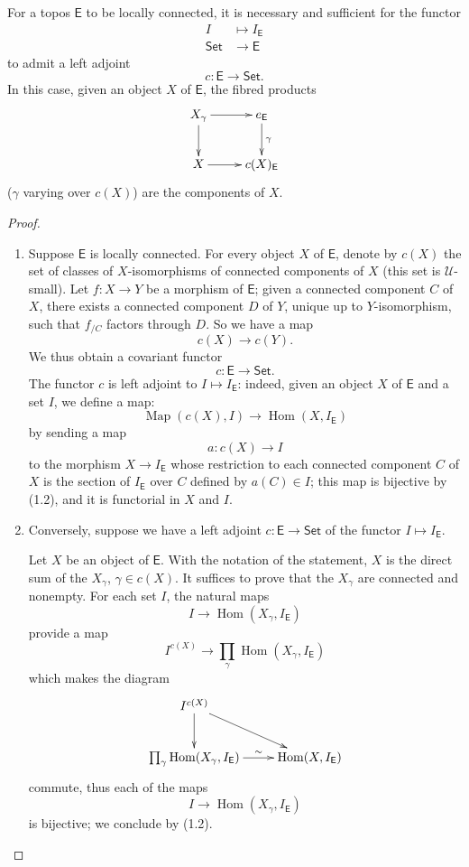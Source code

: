 \documentclass[10pt,oneside]{amsart}
\newcommand{\oldpage}[1]{\marginnote{\textbf{#1}}}
\newcommand{\cal}{\mathcal}
\newcommand{\cat}{\mathsf}
\newcommand{\Set}{\cat{Set}}
\DeclareMathOperator{\Hom}{Hom}
\DeclareMathOperator{\Map}{Map}
\begin{document}
\subsection{}
For a topos $\cat{E}$ to be locally connected, it is necessary and sufficient for the functor
\begin{align*}
  I & \longmapsto I_\cat{E}\\
  \Set & \longrightarrow\cat{E}
\end{align*}
to admit a left adjoint
\[
  c:\cat{E}\longrightarrow\Set.
\]
In this case, given an object $X$ of $\cat{E}$, the fibred products
\[
  \xymatrix{
    X_\gamma\ar[r]\ar[d] & e_\cat{E}\ar[d]^\gamma\\
    X\ar[r] & c(X)_\cat{E}
  }
\]
($\gamma$ varying over $c(X)$) are the components of $X$.

\begin{proof}
\medskip\noindent
\begin{enumerate}[label=(\roman*)]
  \item Suppose $\cat{E}$ is locally connected.
    For every object $X$ of $\cat{E}$, denote by $c(X)$ the set of classes of $X$-isomorphisms of connected components of $X$ (this set is $\cal{U}$-small).
    Let $f:X\to Y$ be a morphism of $\cat{E}$;
    given a connected component $C$ of $X$, there exists a connected component $D$ of $Y$, unique up to $Y$-isomorphism, such that $f_{/C}$ factors through $D$.
    So we have a map
    \[
      c(X)\longrightarrow c(Y).
    \]
    \oldpage{4}
    We thus obtain a covariant functor
    \[
      c:\cat{E}\longrightarrow\Set.
    \]
    The functor $c$ is left adjoint to $I\mapsto I_\cat{E}$: indeed, given an object $X$ of $\cat{E}$ and a set $I$, we define a map:
    \[
      \Map(c(X),I)\longrightarrow\Hom(X,I_\cat{E})
    \]
    by sending a map
    \[
      a:c(X)\longrightarrow I
    \]
    to the morphism $X\to I_\cat{E}$ whose restriction to each connected component $C$ of $X$ is the section of $I_\cat{E}$ over $C$ defined by $a(C)\in I$;
    this map is bijective by (1.2), and it is functorial in $X$ and $I$.
  \item Conversely, suppose we have a left adjoint $c:\cat{E}\to\Set$ of the functor $I\mapsto I_\cat{E}$.

    Let $X$ be an object of $\cat{E}$.
    With the notation of the statement, $X$ is the direct sum of the $X_\gamma$, $\gamma\in c(X)$.
    It suffices to prove that the $X_\gamma$ are connected and nonempty.
    For each set $I$, the natural maps
    \[
      I\longrightarrow\Hom(X_\gamma,I_\cat{E})
    \]
    provide a map
    \[
      I^{c(X)}\longrightarrow\prod_\gamma\Hom(X_\gamma,I_\cat{E})
    \]
    which makes the diagram
    \[
      \xymatrix{
        I^{c(X)}\ar[rd]\ar[d]\\
        \prod_\gamma\Hom(X_\gamma,I_\cat{E})\ar[r]^-\sim & \Hom(X,I_\cat{E})
      }
    \]
    commute, thus each of the maps
    \[ 
      I\longrightarrow\Hom(X_\gamma,I_\cat{E})
    \]
    is bijective;
    we conclude by (1.2).
\end{enumerate}
\end{proof}
\end{document}
